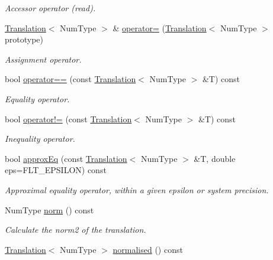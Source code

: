 \begin{DoxyCompactItemize}
\begin{DoxyCompactList}\small\item\em Accessor operator (read). \end{DoxyCompactList}\item 
\hyperlink{singletonscrews_1_1_translation}{Translation}$<$ Num\+Type $>$ \& \hyperlink{singletonscrews_1_1_translation_aee5f1953bbbcbd824698b7789f5c07ba}{operator=} (\hyperlink{singletonscrews_1_1_translation}{Translation}$<$ Num\+Type $>$ prototype)
\begin{DoxyCompactList}\small\item\em Assignment operator. \end{DoxyCompactList}\item 
bool \hyperlink{singletonscrews_1_1_translation_a364c585cd53c02ae8a768b82566234c8}{operator==} (const \hyperlink{singletonscrews_1_1_translation}{Translation}$<$ Num\+Type $>$ \&T) const 
\begin{DoxyCompactList}\small\item\em Equality operator. \end{DoxyCompactList}\item 
bool \hyperlink{singletonscrews_1_1_translation_ab72265972cfe0c957c24470d9b608481}{operator!=} (const \hyperlink{singletonscrews_1_1_translation}{Translation}$<$ Num\+Type $>$ \&T) const 
\begin{DoxyCompactList}\small\item\em Inequality operator. \end{DoxyCompactList}\item 
bool \hyperlink{singletonscrews_1_1_translation_a00a7ee27700ebf49db912f3e7c60ae7e}{approx\+Eq} (const \hyperlink{singletonscrews_1_1_translation}{Translation}$<$ Num\+Type $>$ \&T, double eps=F\+L\+T\+\_\+\+E\+P\+S\+I\+L\+O\+N) const 
\begin{DoxyCompactList}\small\item\em Approximal equality operator, within a given epsilon or system precision. \end{DoxyCompactList}\item 
Num\+Type \hyperlink{singletonscrews_1_1_translation_a5dd520d584aaf3896c659f13fa08597d}{norm} () const 
\begin{DoxyCompactList}\small\item\em Calculate the norm2 of the translation. \end{DoxyCompactList}\item 
\hyperlink{singletonscrews_1_1_translation}{Translation}$<$ Num\+Type $>$ \hyperlink{singletonscrews_1_1_translation_abd1528625164d21e97a648990ad959ac}{normalised} () const 

\end{DoxyCompactItemize}
